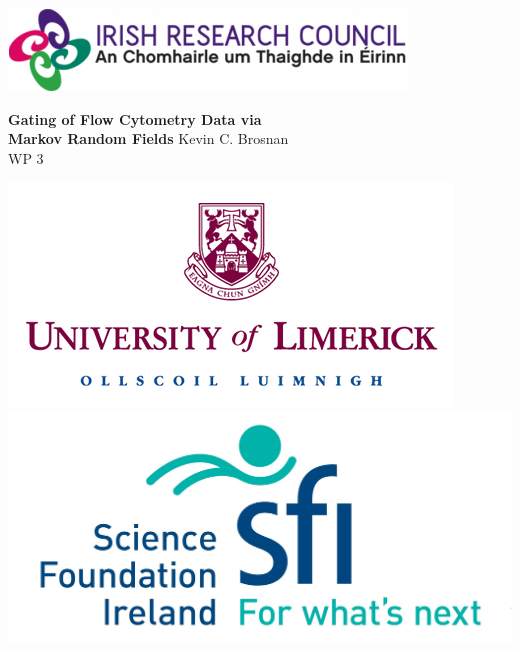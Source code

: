 \documentclass[a0paper,portrait,fontscale=0.3]{baposter}
\begin{document}
\begin{poster}
{\begin{minipage}{0.15\textwidth}
\begin{center}
		\vspace{5mm}
		\includegraphics[height = 0.02\textheight]{images/irc_logo.png}
	\end{center}
\end{minipage}
}
{\bf Gating of Flow Cytometry Data via \\ Markov Random Fields \vspace{0.3em}}
{Kevin C. Brosnan\\ \small{ WP 3}}
{\begin{minipage}{0.15\textwidth}
	\begin{center}
		\includegraphics[height = 0.05\textheight]{images/ul_logo.png} 
		\vspace{0.5em}
		\includegraphics[height = 0.04\textheight]{images/sfi_logo.jpg} 
	\end{center}
\end{minipage}}
   

\end{poster}
\end{document}
